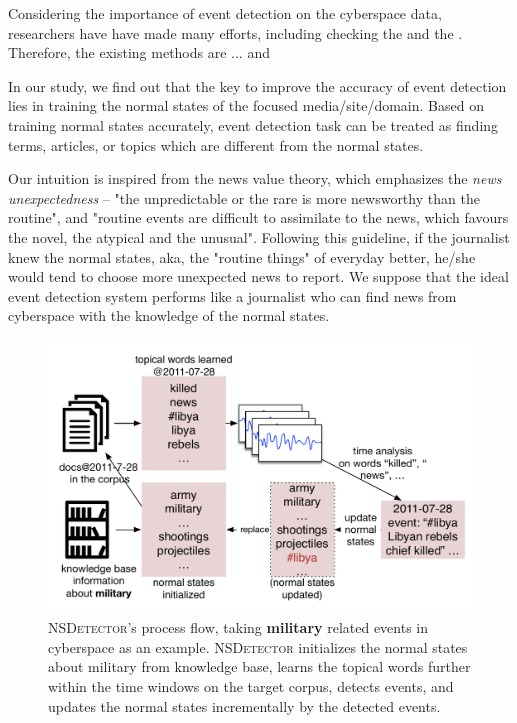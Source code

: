 \documentclass[conference,compsoc]{IEEEtran}
\begin{document}
Considering the importance of event detection on the cyberspace data, researchers have have made many efforts, including checking the and the . Therefore, the existing methods are ... and 

In our study, we find out that the key to improve the accuracy of event detection lies in training the normal states of the focused media/site/domain. Based on training normal states accurately, event detection task can be treated as finding terms, articles, or topics which are different from the normal states. 

Our intuition is inspired from the news value theory\cite{galtung1965structure}\cite{caple2013delving}, which emphasizes the \textit{news unexpectedness} -- "the unpredictable or the rare is more newsworthy than the routine"\cite{bell1991language}, and "routine events are difficult to assimilate to the news, which favours the novel, the atypical and the unusual"\cite{montgomery2007discourse}.
Following this guideline, if the journalist knew the normal states, aka, the "routine things" of everyday better, he/she would tend to choose more unexpected news to report. 
We suppose that the ideal event detection system performs like a journalist who can find news from cyberspace with the knowledge of the normal states. 

\begin{figure}
    \label{fig:modelDesc}
    \includegraphics[width=1.0\columnwidth]{img/NSDetectorExample.pdf}
    \caption{\textsc{NSDetector}'s process flow, taking \textbf{military} related events in cyberspace as an example. \textsc{NSDetector} initializes the normal states about military from knowledge base, learns the topical words further within the time windows on the target corpus, detects events, and updates the normal states incrementally by the detected events.}
\end{figure}
\end{document}
